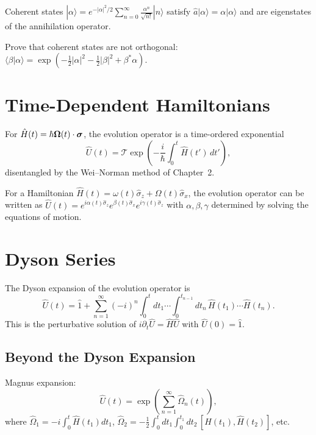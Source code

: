 Coherent states $|\alpha\rangle=e^{-|\alpha|^2/2}\sum_{n=0}^\infty\frac{\alpha^n}{\sqrt{n!}}|n\rangle$
satisfy $\hat a|\alpha\rangle=\alpha|\alpha\rangle$ and are eigenstates of the
annihilation operator.

\begin{exercise}
Prove that coherent states are not orthogonal:
$\langle\beta|\alpha\rangle = \exp(-\tfrac12|\alpha|^2-\tfrac12|\beta|^2+\beta^*\alpha)$.
\end{exercise}

\section{Time-Dependent Hamiltonians}

For $\hat H(t)=\hbar\bm{\Omega}(t)\cdot\bm{\sigma}$, the evolution operator is a
time-ordered exponential
\begin{equation}
\hat U(t) = \mathcal T\exp\!\left(-\frac{i}{\hbar}\int_0^t\hat H(t')\,dt'\right),
\label{eq:7.7.1}
\end{equation}
disentangled by the Wei--Norman method of Chapter~2.

For a Hamiltonian $\hat H(t)=\omega(t)\hat\sigma_z+\Omega(t)\hat\sigma_x$,
the evolution operator can be written as
$\hat U(t)=e^{i\alpha(t)\hat\sigma_z}e^{\beta(t)\hat\sigma_x}e^{i\gamma(t)\hat\sigma_z}$
with $\alpha,\beta,\gamma$ determined by solving the equations of motion.

\section{Dyson Series}

The Dyson expansion of the evolution operator is
\begin{equation}
\hat U(t)=\hat 1+\sum_{n=1}^{\infty}(-i)^n\int_0^t dt_1\cdots\int_0^{t_{n-1}}dt_n\,
\hat H(t_1)\cdots\hat H(t_n).
\label{eq:7.8.1}
\end{equation}
This is the perturbative solution of $i\partial_t\hat U=\hat H\hat U$
with $\hat U(0)=\hat 1$.

\subsection{Beyond the Dyson Expansion}

Magnus expansion:
\begin{equation}
\hat U(t) = \exp\!\left(\sum_{n=1}^{\infty}\hat\Omega_n(t)\right),
\label{eq:7.8.2}
\end{equation}
where $\hat\Omega_1=-i\int_0^t\hat H(t_1)dt_1$,
$\hat\Omega_2=-\frac12\int_0^t dt_1\int_0^{t_1}dt_2\,[\hat H(t_1),\hat H(t_2)]$, etc.

